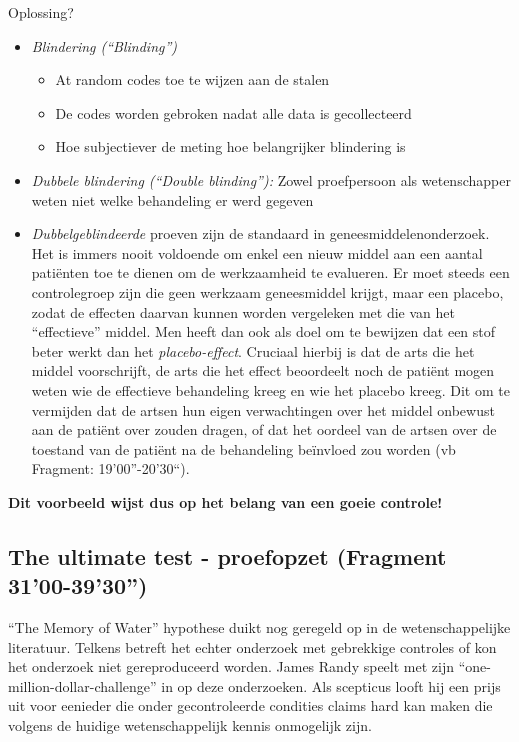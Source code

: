 \documentclass[12pt,dutch,coursenotes]{book}
\providecommand{\tightlist}{%
  \setlength{\itemsep}{0pt}\setlength{\parskip}{0pt}}
\theoremstyle{definition}
\theoremstyle{definition}
\theoremstyle{definition}
\theoremstyle{remark}
\begin{document}
Oplossing?

\begin{itemize}
\tightlist
\item
  \emph{Blindering (``Blinding'')}

  \begin{itemize}
  \tightlist
  \item
    At random codes toe te wijzen aan de stalen
  \item
    De codes worden gebroken nadat alle data is gecollecteerd
  \item
    Hoe subjectiever de meting hoe belangrijker blindering is
  \end{itemize}
\item
  \emph{Dubbele blindering (``Double blinding''):} Zowel proefpersoon
  als wetenschapper weten niet welke behandeling er werd gegeven
\item
  \emph{Dubbelgeblindeerde} proeven zijn de standaard in
  geneesmiddelenonderzoek. Het is immers nooit voldoende om enkel een
  nieuw middel aan een aantal patiënten toe te dienen om de werkzaamheid
  te evalueren. Er moet steeds een controlegroep zijn die geen werkzaam
  geneesmiddel krijgt, maar een placebo, zodat de effecten daarvan
  kunnen worden vergeleken met die van het ``effectieve'' middel. Men
  heeft dan ook als doel om te bewijzen dat een stof beter werkt dan het
  \emph{placebo-effect}. Cruciaal hierbij is dat de arts die het middel
  voorschrijft, de arts die het effect beoordeelt noch de patiënt mogen
  weten wie de effectieve behandeling kreeg en wie het placebo kreeg.
  Dit om te vermijden dat de artsen hun eigen verwachtingen over het
  middel onbewust aan de patiënt over zouden dragen, of dat het oordeel
  van de artsen over de toestand van de patiënt na de behandeling
  beïnvloed zou worden (vb Fragment: 19'00''-20'30``).
\end{itemize}

\textbf{Dit voorbeeld wijst dus op het belang van een goeie controle!}

\subsection{The ultimate test - proefopzet (Fragment
31'00-39'30'')}\label{the-ultimate-test---proefopzet-fragment-3100-3930}

``The Memory of Water'' hypothese duikt nog geregeld op in de
wetenschappelijke literatuur. Telkens betreft het echter onderzoek met
gebrekkige controles of kon het onderzoek niet gereproduceerd worden.
James Randy speelt met zijn ``one-million-dollar-challenge'' in op deze
onderzoeken. Als scepticus looft hij een prijs uit voor eenieder die
onder gecontroleerde condities claims hard kan maken die volgens de
huidige wetenschappelijk kennis onmogelijk zijn.
\end{document}
